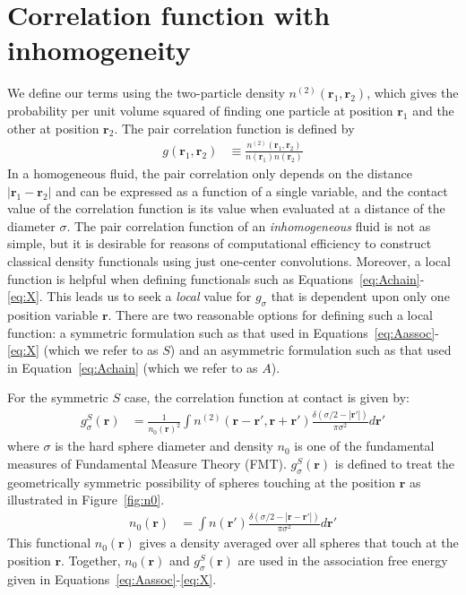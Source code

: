 \documentclass[letterpaper,amsmath,amssymb,10pt,pre]{revtex4-1}
\newcommand{\rr}{\textbf{r}}
\begin{document}
\section{Correlation function with inhomogeneity}

We define our terms using the two-particle density
$n^{(2)}(\rr_1,\rr_2)$, which gives the probability per unit volume
squared of finding one particle at position $\rr_1$ and the other at
position $\rr_2$.  The pair correlation function is defined by
\begin{align}
  g(\rr_1,\rr_2) &\equiv \frac{n^{(2)}(\rr_1,\rr_2)}{n(\rr_1)n(\rr_2)}
\end{align}
In a homogeneous fluid, the pair correlation only depends on the
distance $|\rr_1-\rr_2|$ and can be expressed as a function of a
single variable, and the contact value of the correlation function is
its value when evaluated at a distance of the diameter $\sigma$.  The
pair correlation function of an \emph{inhomogeneous} fluid is not as
simple, but it is desirable for reasons of computational efficiency to
construct classical density functionals using just one-center
convolutions.  Moreover, a local function is helpful when defining
functionals such as Equations~\ref{eq:Achain}-\ref{eq:X}.  This leads
us to seek a \emph{local} value for $g_\sigma$ that is dependent upon
only one position variable $\rr$.  There are two reasonable options
for defining such a local function: a symmetric formulation such as
that used in Equations~\ref{eq:Aassoc}-\ref{eq:X} (which we refer to
as $S$) and an asymmetric formulation such as that used in
Equation~\ref{eq:Achain} (which we refer to as $A$).

For the symmetric $S$ case, the correlation function at contact is
given by:
\begin{align}
  g^S_\sigma(\rr) &= \frac{1}{n_0(\rr)^2}\int n^{(2)}(\rr - \rr', \rr
  + \rr')
  \frac{\delta(\sigma/2 -|\rr'|)}{\pi\sigma^2}d\rr' \label{eq:gS}
\end{align}
where $\sigma$ is the hard sphere diameter and density $n_0$ is one of the fundamental measures of Fundamental
Measure Theory (FMT).  $g^S_\sigma(\rr)$ is defined to treat the geometrically
symmetric possibility of spheres touching at the position $\rr$ as
illustrated in Figure~\ref{fig:n0}.
\begin{align}
  n_0(\rr) &= \int n(\rr')\frac{\delta(\sigma/2 -|\rr-\rr'|)}{\pi\sigma^2} d\rr'
  \label{eq:n0}
\end{align}
This functional $n_0(\rr)$ gives a density averaged over all spheres that touch at
the position $\rr$.  Together, $n_0(\rr)$ and $g_\sigma^S(\rr)$ are
used in the association free energy given in Equations~\ref{eq:Aassoc}-\ref{eq:X}.
\end{document}
